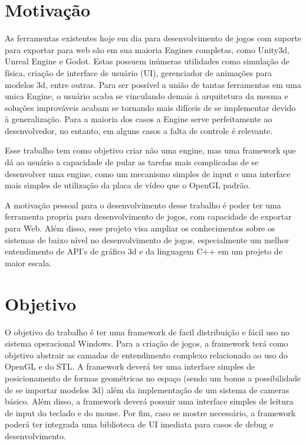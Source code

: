 \section{Motivação}

As ferramentas existentes hoje em dia para desenvolvimento de jogos com suporte para exportar para web são em sua maioria Engines completas, como Unity3d, Unreal Engine e Godot. Estas possuem inúmeras utilidades como simulação de física, criação de interface de usuário (UI), gerenciador de animações para modelos 3d, entre outras. Para ser possível a união de tantas ferramentas em uma unica Engine, o usuário acaba se vinculando demais à arquitetura da mesma e soluções improváveis acabam se tornando mais difíceis de se implementar devido à generalização. Para a maioria dos casos a Engine serve perfeitamente ao desenvolvedor, no entanto, em alguns casos a falta de controle é relevante.

Esse trabalho tem como objetivo criar não uma engine, mas uma framework que dá ao usuário a capacidade de pular as tarefas mais complicadas de se desenvolver uma engine, como um mecanismo simples de input e uma interface mais simples de utilização da placa de vídeo que o OpenGL padrão.

A motivação pessoal para o desenvolvimento desse trabalho é poder ter uma ferramenta propria para desenvolvimento de jogos, com capacidade de exportar para Web. Além disso, esse projeto visa ampliar os conhecimentos sobre os sistemas de baixo nível no desenvolvimento de jogos, especialmente um melhor entendimento de API's de gráfico 3d e da linguagem C++ em um projeto de maior escala.

\section{Objetivo}

O objetivo do trabalho é ter uma framework de facil distribuição e fácil uso no sistema operacional Windows. Para a criação de jogos, a framework terá como objetivo abstrair as camadas de entendimento complexo relacionado ao uso do OpenGL e do STL. A framework deverá ter uma interface simples de posicionamento de formas geométricas no espaço (sendo um bonus a possibilidade de se importar modelos 3d) além da implementação de um sistema de cameras básico. Além disso, a framework deverá possuir uma interface simples de leitura de input do teclado e do mouse. Por fim, caso se mostre necessário, a framework poderá ter integrada uma biblioteca de UI imediata para casos de debug e desenvolvimento.

